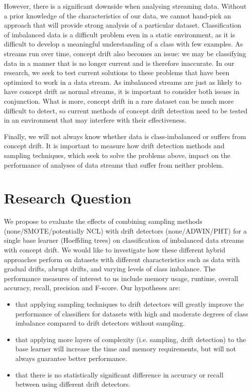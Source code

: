 \documentclass[11pt]{article}\usepackage[]{graphicx}\usepackage[]{color}
\begin{document}
However, there is a significant downside when analysing streaming data. Without a prior knowledge of the characteristics of our data, we cannot hand-pick an approach that will provide strong analysis of a particular dataset. Classification of imbalanced data is a difficult problem even in a static environment, as it is difficult to develop a meaningful understanding of a class with few examples. As streams run over time, concept drift also becomes an issue: we may be classifying data in a manner that is no longer current and is therefore inaccurate. In our research, we seek to test current solutions to these problems that have been optimized to work in a data stream. As imbalanced streams are just as likely to have concept drift as normal streams, it is important to consider both issues in conjunction. What is more, concept drift in a rare dataset can be much more difficult to detect, so current methods of concept drift detection need to be tested in an environment that may interfere with their effectiveness.

Finally, we will not always know whether data is class-imbalanced or suffers from concept drift. It is important to measure how drift detection methods and sampling techniques, which seek to solve the problems above, impact on the performance of analyses of data streams that suffer from neither problem.

\section{Research Question}

We propose to evaluate the effects of combining sampling methods (none/SMOTE/potentially NCL) with drift detectors (none/ADWIN/PHT) for a single base learner (Hoeffding trees) on classification of imbalanced data streams with concept drift. We would like to investigate how these different hybrid approaches perform on datasets with different characteristics such as data with gradual drifts, abrupt drifts, and varying levels of class imbalance. The performance measures of interest to us include memory usage, runtime, overall accuracy, recall, precision and F-score. Our hypotheses are:

\begin{itemize}
\item that applying sampling techniques to drift detectors will greatly improve the performance of classifiers for datasets with high and moderate degrees of class imbalance compared to drift detectors without sampling. 
\item that applying more layers of complexity (i.e. sampling, drift detection) to the base learner will increase the time and memory requirements, but will not always guarantee better performance.
\item that there is no statistically significant difference in accuracy or recall between using different drift detectors.
\end{itemize} 
\end{document}

